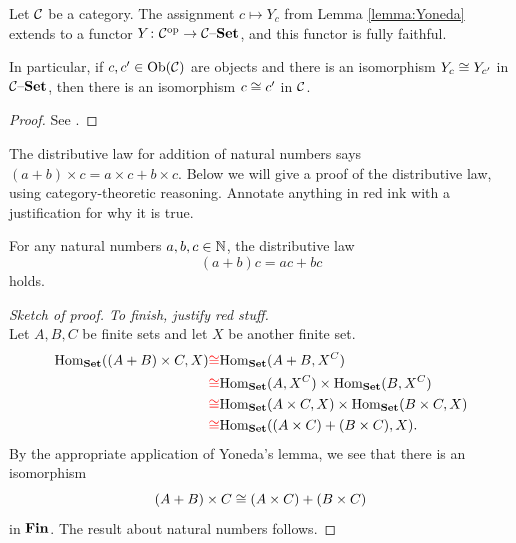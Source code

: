 \documentclass[CT4S-EN-RU]{subfiles}
\begin{document}
\begin{lemma}

Let $\mathcal{C}$ be a category. The assignment $c\mapsto Y_c$ from Lemma \ref{lemma:Yoneda} extends to a functor $Y\colon\mathcal{C}^\textnormal{op}\rightarrow\mathcal{C}{\text \textendash}{\bf Set}$, and this functor is fully faithful. 

In particular, if $c,c'\in\textnormal{Ob}(\mathcal{C})$ are objects and there is an isomorphism $Y_c\cong Y_{c'}$ in $\mathcal{C}{\text \textendash}{\bf Set}$, then there is an isomorphism $c\cong c'$ in $\mathcal{C}$.

\end{lemma}
\begin{proof}
See \cite{Mac}.
\end{proof}

\begin{exercise}
The distributive law for addition of natural numbers says $(a+b)\times c=a\times c+b\times c$. Below we will give a proof of the distributive law, using category-theoretic reasoning. Annotate anything in {\color{red}red} ink  with a justification for why it is true.
\begin{proposition}
For any natural numbers $a,b,c\in{\mathbb N}$, the distributive law 
$$(a+b)c=ac+bc$$ 
holds.
\end{proposition}
\begin{proof}[Sketch of proof. To finish, justify {\color{red}red stuff}]
~\\
Let $A,B,C$ be finite sets and let $X$ be another finite set.
\begin{align*}
\textnormal{Hom}_{\bf Set}((A+B)\times C,X)
&{\color{red}\cong}\textnormal{Hom}_{\bf Set}(A+B,X^C)\\
&{\color{red}\cong}\textnormal{Hom}_{\bf Set}(A,X^C)\times\textnormal{Hom}_{\bf Set}(B,X^C)\\
&{\color{red}\cong}\textnormal{Hom}_{\bf Set}(A\times C,X)\times\textnormal{Hom}_{\bf Set}(B\times C,X)\\
&{\color{red}\cong}\textnormal{Hom}_{\bf Set}((A\times C)+(B\times C),X).
\end{align*}
By {\color{red} the appropriate application} of Yoneda's lemma, we see that there is an isomorphism
$$(A+B)\times C\cong(A\times C)+(B\times C)$$
in ${\bf Fin}$. The result about natural numbers {\color{red}follows}.
\end{proof}
\end{exercise}




\subsubsection{}
\end{document}
